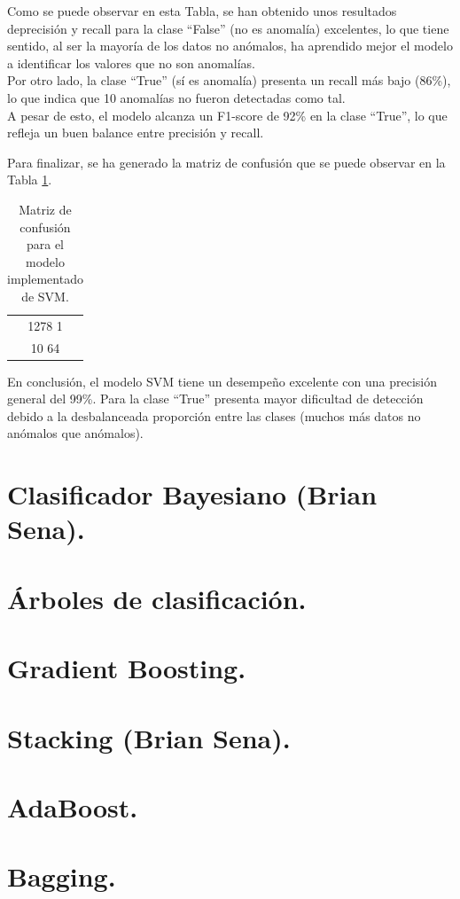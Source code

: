 \documentclass[12pt,letterpaper]{article}
\begin{document}
Como se puede observar en esta Tabla, se han obtenido unos resultados deprecisión y recall para la clase ``False'' (no es anomalía) excelentes, lo que tiene sentido, al ser la mayoría de los datos no anómalos, ha aprendido mejor el modelo a identificar los valores que no son anomalías.\\
Por otro lado, la clase ``True'' (sí es anomalía) presenta un recall más bajo (86\%), lo que indica que 10 anomalías no fueron detectadas como tal.\\
A pesar de esto, el modelo alcanza un F1-score de 92\% en la clase ``True'', lo que refleja un buen balance entre precisión y recall.

Para finalizar, se ha generado la matriz de confusión que se puede observar en la Tabla \ref{tab:confusion-SVM}.
\begin{table}[H]
    \centering
    \begin{tabular}{|c|}
    \hline
    1278 \hspace{8mm} 1 \\ 
    10 \hspace{10mm} 64 \\ \hline
    \end{tabular}
    \caption{Matriz de confusión para el modelo implementado de SVM.}
    \label{tab:confusion-SVM}
\end{table}

En conclusión, el modelo SVM tiene un desempeño excelente con una precisión general del 99\%. Para la clase ``True'' presenta mayor dificultad de detección debido a la desbalanceada proporción entre las clases (muchos más datos no anómalos que anómalos).


\section{Clasificador Bayesiano (Brian Sena).}

\section{Árboles de clasificación.}
\section{Gradient Boosting.}
\section{Stacking (Brian Sena).}
\section{AdaBoost.}
\section{Bagging.}
\printbibliography
\end{document}
